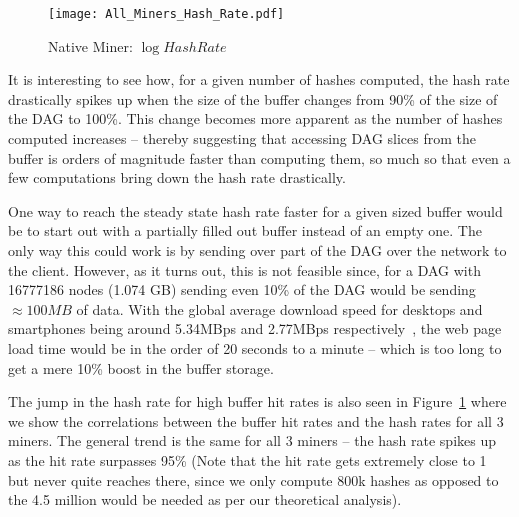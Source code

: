 \documentclass[runningheads]{llncs}
\begin{document}
\begin{figure}[h]
\centering
\texttt{[image: All\_Miners\_Hash\_Rate.pdf]}
\caption{Native Miner: $\log{Hash Rate}$}
\label{fig:HashRateTraj} 
\end{figure}

\begin{figure}[t]
       \centering
\end{figure}

It is interesting to see how, for a given number of hashes computed, the hash rate drastically spikes up when the size of the buffer changes from 90\% of the size of the DAG to 100\%. This change becomes more apparent as the number of hashes computed increases -- thereby suggesting that accessing DAG slices from the buffer is orders of magnitude faster than computing them, so much so that even a few computations bring down the hash rate drastically. 

One way to reach the steady state hash rate faster for a given sized buffer would be to start out with a partially filled out buffer instead of an empty one. The only way this could work is by sending over part of the DAG over the network to the client. However, as it turns out, this is not feasible since, for a DAG with 16777186 nodes (1.074 GB) sending even 10\% of the DAG would be sending $\approx100MB$ of data. With the global average download speed for desktops and smartphones being around 5.34MBps and 2.77MBps respectively~\cite{internetSpeed}, the web page load time would be in the order of 20 seconds to a minute -- which is too long to get a mere 10\% boost in the buffer storage. 

The jump in the hash rate for high buffer hit rates is also seen in Figure~\ref{fig:HashRateTraj} where we show the correlations between the buffer hit rates and the hash rates for all 3 miners. The general trend is the same for all 3 miners -- the hash rate spikes up as the hit rate surpasses 95\% (Note that the hit rate gets extremely close to 1 but never quite reaches there, since we only compute 800k hashes as opposed to the 4.5 million would be needed as per our theoretical analysis).
\end{document}
